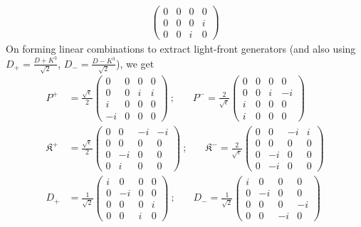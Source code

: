 \documentclass[]{article}
\numberwithin{equation}{section}
\begin{document}
{{\begin{align}
\begin{pmatrix}
        0&0&0&0\\
        0&0&0&i\\
        0&0&i&0
    \end{pmatrix}
\end{align}
On forming linear combinations to extract light-front generators (and also using $D_{+}=\frac{D+K^{3}}{\sqrt{2}}$, $D_{-}=\frac{D-K^{3}}{\sqrt{2}}$), we get
\begin{align}
    P^{{+}}&=\frac{\sqrt{\epsilon}}{2}\begin{pmatrix}
        0&0&0&0\\
        0&0&i&i\\
        i&0&0&0\\
        -i&0&0&0
    \end{pmatrix}~;~~~~~~~~P^{-}=\frac{2}{\sqrt{\epsilon}}\begin{pmatrix}
        0&0&0&0\\
        0&0&i&-i\\
        i&0&0&0\\
        i&0&0&0
    \end{pmatrix}\nonumber\\
    \mathfrak{K}^{+}&=\frac{\sqrt{\epsilon}}{2}\begin{pmatrix}
        0&0&-i&-i\\
        0&0&0&0\\
        0&-i&0&0\\
        0&i&0&0
    \end{pmatrix}~;~~~~~~~~\mathfrak{K}^{-}=\frac{2}{\sqrt{\epsilon}}\begin{pmatrix}
        0&0&-i&i\\
        0&0&0&0\\
        0&-i&0&0\\
        0&-i&0&0
    \end{pmatrix}\nonumber\\
    D_{+}&=\frac{1}{\sqrt{2}}\begin{pmatrix}
        i&0&0&0\\
        0&-i&0&0\\
        0&0&0&i\\
        0&0&i&0
    \end{pmatrix}~;~~~~~~~~D_{-}=\frac{1}{\sqrt{2}}\begin{pmatrix}
        i&0&0&0\\
        0&-i&0&0\\
        0&0&0&-i\\
        0&0&-i&0
    \end{pmatrix}

\end{align}}}
\end{document}
